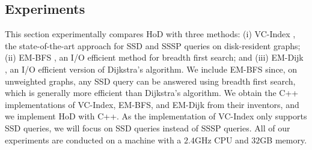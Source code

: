 \documentclass{sig-alternate}
\begin{document}
\begin{sloppy}
\section{Experiments}\label{sec:exp}


This section experimentally compares HoD with three methods: (i) VC-Index \cite{ckcc12}, the state-of-the-art approach for SSD and SSSP queries on disk-resident graphs; (ii) EM-BFS \cite{adm06}, an I/O efficient method for breadth first search; and (iii) EM-Dijk \cite{mo09}, an I/O efficient version of Dijkstra's algorithm. We include EM-BFS since, on unweighted graphs, any SSD query can be answered using breadth first search, which is generally more efficient than Dijkstra's algorithm. We obtain the C++ implementations of VC-Index, EM-BFS, and EM-Dijk from their inventors, and we implement HoD with C++. As the implementation of VC-Index only supports SSD queries, we will focus on SSD queries instead of SSSP queries. All of our experiments are conducted on a machine with a $2.4$GHz CPU and $32$GB memory.


\end{sloppy}
\end{document}
